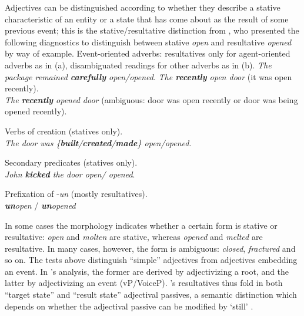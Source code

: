 Adjectives can be distinguished according to whether they describe a stative characteristic of an entity or a state that has come about as the result of some previous event; this is the stative/resultative distinction from \cite{embick04li}, who presented the following diagnostics to distinguish between stative \emph{open} and resultative \emph{opened} by way of example.
\pex Event-oriented adverbs: resultatives only for agent-oriented adverbs as in (a), disambiguated readings for other adverbs as in (b).
	\a \emph{The package remained \textbf{carefully} \xmark open/\cmark opened}.
	\a \emph{The \textbf{recently} open door} (it was open recently).\\
		\emph{The \textbf{recently} opened door} (ambiguous: door was open recently or door was being opened recently).
\xe

\ex Verbs of creation (statives only).\\
	\emph{The door was \{\textbf{built}/\textbf{created}/\textbf{made}\} \cmark open/\xmark opened}.
\xe

\ex Secondary predicates (statives only).\\
	\emph{John \textbf{kicked} the door \cmark open/ \xmark opened}.
\xe

\ex Prefixation of -\emph{un} (mostly resultatives).\\
	\xmark \emph{\textbf{un}open} / \cmark \emph{\textbf{un}opened}
\xe

In some cases the morphology indicates whether a certain form is stative or resultative: \emph{open} and \emph{molten} are stative, whereas \emph{opened} and \emph{melted} are resultative. In many cases, however, the form is ambiguous: \emph{closed}, \emph{fractured} and so on. The tests above distinguish ``simple'' adjectives from adjectives embedding an event. In \citeauthor{embick04li}'s analysis, the former are derived by adjectivizing a root, and the latter by adjectivizing an event (vP/VoiceP). \citeauthor{embick04li}'s resultatives thus fold in both ``target state'' and ``result state'' adjectival passives, a semantic distinction which depends on whether the adjectival passive can be modified by `still' \citep{kratzer00bls,alexiadouetal14}.

